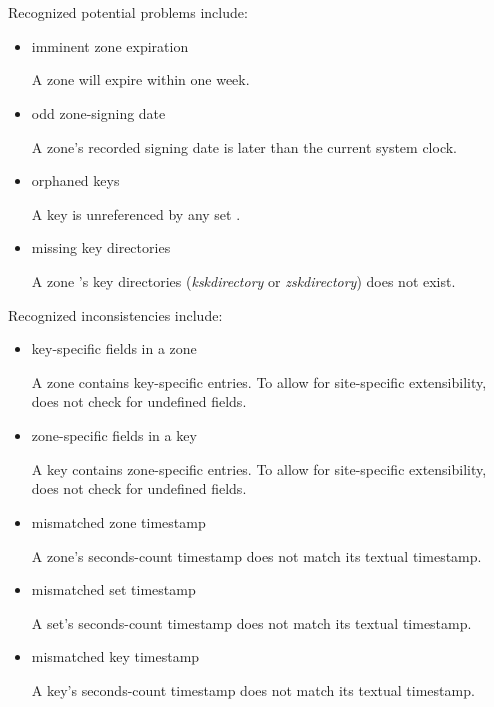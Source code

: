 Recognized potential problems include:

\begin{itemize}

\item imminent zone expiration\verb" "

A zone will expire within one week. 

\item odd zone-signing date\verb" "

A zone's recorded signing date is later than the current system clock.

\item orphaned keys\verb" "

A key  is unreferenced by any set .

\item missing key directories\verb" "

A zone 's key directories ({\it kskdirectory} or {\it
zskdirectory}) does not exist.

\end{itemize}

Recognized inconsistencies include:

\begin{itemize}

\item key-specific fields in a zone \verb" "

A zone  contains key-specific entries.  To allow for
site-specific extensibility,  does not check for undefined
 fields.

\item zone-specific fields in a key \verb" "

A key  contains zone-specific entries.  To allow for
site-specific extensibility,  does not check for undefined
 fields.

\item mismatched zone timestamp\verb" "

A zone's seconds-count timestamp does not match its textual timestamp.

\item mismatched set timestamp\verb" "

A set's seconds-count timestamp does not match its textual timestamp.

\item mismatched key timestamp\verb" "

A key's seconds-count timestamp does not match its textual timestamp.

\end{itemize}

